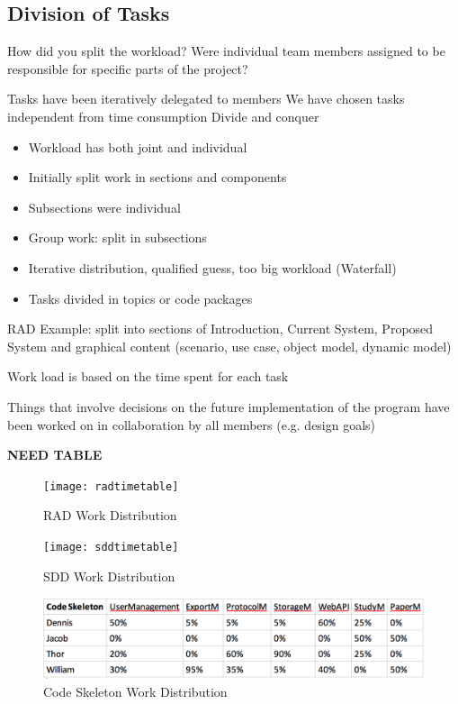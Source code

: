 \subsection{Division of Tasks}

How did you split the workload? Were individual team members assigned to be responsible for specific parts of the project?

Tasks have been iteratively delegated to members 
We have chosen tasks independent from time consumption
Divide and conquer 
\begin{itemize}
	\item Workload has both joint and individual 
	\item Initially split work in sections and components 
	\item Subsections were individual 
	\item Group work: split in subsections 
	\item Iterative distribution, qualified guess, too big workload (Waterfall) 
	\item Tasks divided in topics or code packages 
\end{itemize}

RAD Example: split into sections of Introduction, Current System, Proposed System and graphical content (scenario, use case, object model, dynamic model)

Work load is based on the time spent for each task 

Things that involve decisions on the future implementation of the program have been worked on in collaboration by all members (e.g. design goals)


\textbf{NEED TABLE}

\begin{figure}[H]
	\texttt{[image: radtimetable]}
	\caption{RAD Work Distribution}
	\label{fig:rad}
\end{figure}

\begin{figure}[H]
	\texttt{[image: sddtimetable]}
	\caption{SDD Work Distribution}
	\label{fig:sdd}
\end{figure}

\begin{figure}[H]
	\includegraphics{image/skeletontimetable}
	\caption{Code Skeleton Work Distribution}
	\label{fig:codeskeleton} %
\end{figure}
